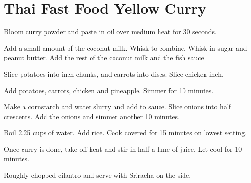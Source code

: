 \section{Thai Fast Food Yellow Curry}
\begin{recipe}


        
Bloom curry powder and paste  in oil over medium heat for 30 seconds. 


Add a small amount of the coconut milk. Whisk to combine. Whisk in sugar and peanut butter. 
Add the rest of the coconut milk and the fish sauce. 


Slice potatoes into  inch chunks, and carrots into discs. Slice chicken  inch. 

Add potatoes, carrots, chicken and pineapple. Simmer for 10 minutes. 

Make a cornstarch and water slurry and add to sauce. Slice onions into half crescents. Add the onions and simmer another 10 minutes. 


Boil 2.25 cups of water. Add rice. Cook covered for 15 minutes on lowest setting. 


Once curry is done, take off heat and stir in half a lime of juice. Let cool for 10 minutes. 

Roughly chopped cilantro and serve with Sriracha on the side. 

\end{recipe}
